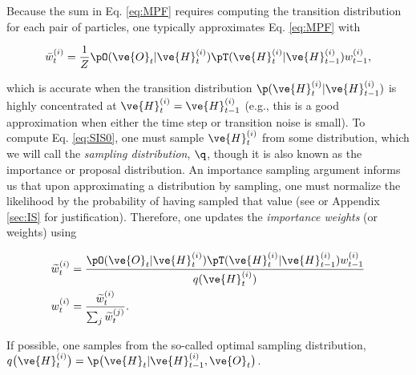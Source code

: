 \documentclass{article}
\begin{document}
\noindent Because the sum in Eq. \ref{eq:MPF} requires computing the transition distribution for each pair of particles, one typically approximates Eq. \ref{eq:MPF} with

\begin{align}\label{eq:SIS0}
\bar{w}_t^{(i)} = \frac{1}{Z} \pO(\ve{O}_t | \ve{H}_t^{(i)}) %
\pT(\ve{H}_t^{(i)} | \ve{H}_{t-1}^{(i)}) w_{t-1}^{(i)},
\end{align}%

\noindent which is accurate when the transition distribution $\p(\ve{H}_t^{(i)} | \ve{H}_{t-1}^{(i)})$ is highly concentrated at $\ve{H}_t^{(i)} = \ve{H}_{t-1}^{(i)}$ (e.g., this is a good approximation when either the time step or transition noise is small). To compute Eq. \ref{eq:SIS0}, one must sample $\ve{H}_t^{(i)}$ from some distribution, which we will call the \emph{sampling distribution}, $\q$, though it is also known as the importance or proposal distribution. An importance sampling argument informs us that upon approximating a distribution by sampling, one must normalize the likelihood by the probability of having sampled that value (see \cite{DoucetGordon01} or Appendix \ref{sec:IS} for justification).  Therefore, one updates the \emph{importance weights} (or weights) using

\begin{subequations} \label{eq:SIS}
\begin{align} \label{eq:SISa}
\widetilde{w}_t^{(i)} &= \frac{\pO(\ve{O}_t | \ve{H}_t^{(i)})  \pT(\ve{H}_t^{(i)} | \ve{H}_{t-1}^{(i)}) w_{t-1}^{(i)}}{q(\ve{H}_t^{(i)})}  %
\\ w_t^{(i)} &= \frac{\widetilde{w}_t^{(i)}}{\sum_j \widetilde{w}_t^{(j)}}. \label{eq:SISb}
\end{align}
\end{subequations}

\noindent If possible, one samples from the so-called optimal sampling distribution, $q\big(\ve{H}_t^{(i)}\big)=\p\big(\ve{H}_t | \ve{H}_{t-1}^{(i)}, \ve{O}_t\big)$.
\end{document}
